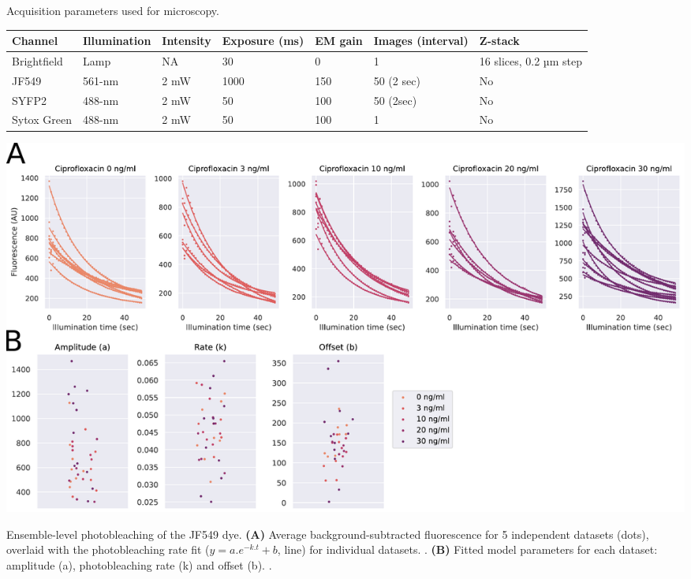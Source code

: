 \begin{supptable}[htbp]
    \centering
    \caption{Acquisition parameters used for microscopy.}
    \begin{tabular}{lllllll}
        \toprule
        Channel & Illumination & Intensity & Exposure (ms) & EM gain & Images (interval) & Z-stack\\
        \midrule
        Brightfield & Lamp & NA & 30 & 0 & 1 & 16 slices, 0.2 µm step\\
        JF549 & 561-nm & 2 mW & 1000 & 150 & 50 (2 sec) & No\\
        SYFP2 & 488-nm & 2 mW & 50 & 100 & 50 (2sec) & No\\
        Sytox Green & 488-nm & 2 mW & 50 & 100 & 1 & No\\
        \bottomrule
    \end{tabular}
    \label{SItab:acquisition_channels}
\end{supptable}

\begin{suppfigure*}[htbp]
    \begin{center}
    \includegraphics[width=\textwidth]{SI_Figures/SIFig_bleaching.pdf}
    \end{center}
    \caption{Ensemble-level photobleaching of the JF549 dye. \textbf{(A)} Average background-subtracted fluorescence for 5 independent datasets (dots), overlaid with the photobleaching rate fit ($y=a.e^{-k.t}+b$, line) for individual datasets. . \textbf{(B)} Fitted model parameters for each dataset: amplitude (a), photobleaching rate (k) and offset (b). .}
    \label{SIFig:dye_bleaching}
\end{suppfigure*}

